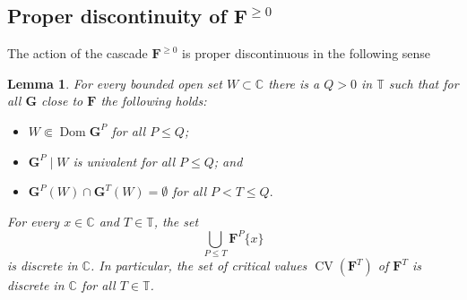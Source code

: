 \documentclass{amsart}
\newcommand{\Dom}{\operatorname {Dom}}
\newcommand{\1}{{\mathbb 1 }}
\newcommand\PT{\mathbb{ T}}
\newcommand{\bF}{{\mathbf F}}
\newcommand{\bG}{{\mathbf G}}
\newcommand{\C}{\mathbb{C}}
\newtheorem{lem}[thm]{Lemma}
\theoremstyle{remark}
\numberwithin{equation}{section}
\theoremstyle{definition}
\newcommand{\CV}{{\operatorname{CV}}}
\theoremstyle{nonumberbreak}
\begin{document}
\subsection{Proper discontinuity of $\bF^{\ge 0}$}
\label{ss:prop disk of F>0}
 The action of the cascade $\bF^{\ge 0}$ is proper discontinuous in the following sense
\begin{lem}
\label{lem:discr of dyn}
For every bounded open set $W\subset \C$ there is a $Q>0$ in $\PT$ such that for all $\bG$ close to $\bF$ the following holds:
\begin{itemize}
\item $W\Subset \Dom \bG^P$ for all $P\le Q$;
\item $\bG^P\mid W$ is univalent for all $P\le Q$; and 
\item $\bG^P(W)\cap \bG^T(W)=\emptyset$ for all $P<T\le Q.$
\end{itemize}


For every $x\in \C$ and $T\in\PT$, the set 
\[\bigcup_{P\le T} \bF^P\{x\} \]
is discrete in $\C$. In particular,  the set of critical values $\CV(\bF^T)$ of $\bF^T$ is discrete in $\C$ for all  $T\in \PT$.
\end{lem}
\end{document}
